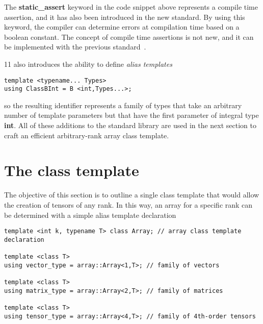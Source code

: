 \documentclass[11pt]{article}
\def\ifmonospace{\ifdim\fontdimen3\font=0pt }
\def\C++{\ifmonospace C++\else C\kern-.1667em\raise.50ex\hbox{\tiny{\textbf{+}\kern-.1em\textbf{+}}}\fi \spacefactor1000 }
\newcommand{\ttfont}[1]{{\ttfamily{#1}}}
\newcommand{\code}[1]{{\footnotesize\ttfamily{#1}}}
\newcommand\keywordd[1]{{\color{DarkOrchid}\footnotesize\ttfamily\textbf{#1}}}
\begin{document}
The \keywordd{static\_assert} keyword in the code snippet above represents a compile time assertion, and it has also been introduced in the new standard. 
By using this keyword, the compiler can determine errors at compilation time based on a boolean constant.
The concept of compile time assertions is not new, and it can be implemented with the previous standard~\cite{Alexandrescu:2001}.


\C++11 also introduces the ability to define \emph{alias templates}
\begin{lstlisting}[frame=none]
template <typename... Types>
using ClassBInt = B <int,Types...>;
\end{lstlisting}
so the resulting identifier \code{ClassBInt} represents a family of types that take an arbitrary number of template parameters but that have the first parameter of integral type \keywordd{int}.
All of these additions to the standard library are used in the next section to craft an efficient arbitrary-rank array class template.

\section{The \ttfont{Array} class template} \label{sec:algebra}

The objective of this section is to outline a single \code{Array} class template that would allow the creation of tensors of any rank.
In this way, an array for a specific rank can be determined with a simple alias template declaration
\begin{lstlisting}[frame=none]
template <int k, typename T> class Array; // array class template declaration

template <class T>
using vector_type = array::Array<1,T>; // family of vectors

template <class T>
using matrix_type = array::Array<2,T>; // family of matrices

template <class T>
using tensor_type = array::Array<4,T>; // family of 4th-order tensors
\end{lstlisting}
\end{document}
